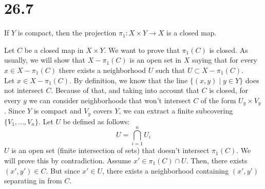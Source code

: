 \documentclass{article}
\begin{document}
    \section*{26.7}
    \begin{tcolorbox}[title=Statement]
        If $Y$ is compact, then the projection $\pi_1\colon X \times Y \to X$ is a closed map.
    \end{tcolorbox}
    \noindent
    Let $C$ be a closed map in $X \times Y$. We want to prove that $\pi_1(C)$ is closed. As usually, we will show that $X - \pi_1(C)$ is an open set in $X$ saying that for every $x \in X - \pi_1(C)$ there exists a neighborhood $U$ such that $U \subset X - \pi_1(C)$. 
    \\
    Let $x \in X - \pi_1(C)$. By definition, we know that the line $\{(x, y) \mid y \in Y\}$ does not intersect $C$. Because of that, and taking into account that $C$ is closed, for every $y$ we can consider neighborhoods that won't intersect $C$ of the form $U_y \times V_y$. Since $Y$ is compact and $V_y$ covers $Y$, we can extract a finite subcovering $\{V_1, ..., V_n\}$. Let $U$ be defined as follows:
    \begin{equation*}
        U = \bigcap_{i=1}^{n}{U_i}
    \end{equation*}
    $U$ is an open set (finite intersection of sets) that doesn't intersect $\pi_1(C)$. We will prove this by contradiction. Assume $x' \in \pi_1(C) \cap U$. Then, there exists $(x', y') \in C$. But since $x' \in U$, there exists a neighborhood containing $(x', y')$ separating in from $C$.
    
\end{document}
